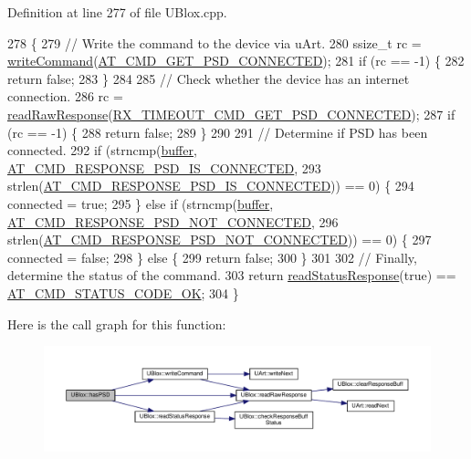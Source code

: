 Definition at line 277 of file U\+Blox.\+cpp.


\begin{DoxyCode}
278 \{
279     \textcolor{comment}{// Write the command to the device via uArt.}
280     ssize\_t rc = \hyperlink{class_u_blox_af604d1897a66192bf1c2a11997f2634d}{writeCommand}(\hyperlink{_u_blox_8cpp_a3ef4cda11e91847283a7ed3c43d0d903}{AT\_CMD\_GET\_PSD\_CONNECTED});
281     \textcolor{keywordflow}{if} (rc == -1) \{
282         \textcolor{keywordflow}{return} \textcolor{keyword}{false};
283     \}
284 
285     \textcolor{comment}{// Check whether the device has an internet connection.}
286     rc = \hyperlink{class_u_blox_ab4a7ab4b8922d91e23f273ae160c1bed}{readRawResponse}(\hyperlink{_u_blox_8cpp_ab65ecdc7509e7b8f4a71ea24f69979bf}{RX\_TIMEOUT\_CMD\_GET\_PSD\_CONNECTED});
287     \textcolor{keywordflow}{if} (rc == -1) \{
288         \textcolor{keywordflow}{return} \textcolor{keyword}{false};
289     \}
290 
291     \textcolor{comment}{// Determine if PSD has been connected.}
292     \textcolor{keywordflow}{if} (strncmp(\hyperlink{class_u_blox_a6ca4b90f3dc4e856181dce1ebda6f82c}{buffer}, \hyperlink{_u_blox_8cpp_af95f84a28382d34c8d3369259eb0fe87}{AT\_CMD\_RESPONSE\_PSD\_IS\_CONNECTED},
293                 strlen(\hyperlink{_u_blox_8cpp_af95f84a28382d34c8d3369259eb0fe87}{AT\_CMD\_RESPONSE\_PSD\_IS\_CONNECTED})) == 0) \{
294         connected = \textcolor{keyword}{true};
295     \} \textcolor{keywordflow}{else} \textcolor{keywordflow}{if} (strncmp(\hyperlink{class_u_blox_a6ca4b90f3dc4e856181dce1ebda6f82c}{buffer}, \hyperlink{_u_blox_8cpp_af39fc0f137b69f6044ec78734d850c38}{AT\_CMD\_RESPONSE\_PSD\_NOT\_CONNECTED},
296                        strlen(\hyperlink{_u_blox_8cpp_af39fc0f137b69f6044ec78734d850c38}{AT\_CMD\_RESPONSE\_PSD\_NOT\_CONNECTED})) == 0) \{
297         connected = \textcolor{keyword}{false};
298     \} \textcolor{keywordflow}{else} \{
299         \textcolor{keywordflow}{return} \textcolor{keyword}{false};
300     \}
301 
302     \textcolor{comment}{// Finally, determine the status of the command.}
303     \textcolor{keywordflow}{return} \hyperlink{class_u_blox_a4eaca5b1b1c4b5b6f6164b220dd43e0b}{readStatusResponse}(\textcolor{keyword}{true}) == \hyperlink{_u_blox_8cpp_a6ebc1682eb6b9964fccb4a61688ff307}{AT\_CMD\_STATUS\_CODE\_OK};
304 \}
\end{DoxyCode}
Here is the call graph for this function\+:\nopagebreak
\begin{figure}[H]
\begin{center}
\leavevmode
\includegraphics[width=350pt]{da/df6/class_u_blox_ae49b51a602a327b5eff5b04d2ccaec20_cgraph}
\end{center}
\end{figure}
